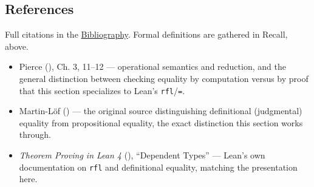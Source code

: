 \subsection{References}\label{sec:05-rigor-check:04-defeq-vs-propeq:8}

Full citations in the \hyperref[sec:root:bibliography:1]{Bibliography}. Formal definitions are gathered in Recall, above.

\begin{itemize}
\tightlist
\item
  Pierce (\cite{Pierce2002}), Ch. 3, 11--12 --- operational semantics and reduction, and the general distinction between checking equality by computation versus by proof that this section specializes to Lean's \texttt{rfl}/\texttt{=}.
\item
  Martin-Löf (\cite{MartinLof1984}) --- the original source distinguishing definitional (judgmental) equality from propositional equality, the exact distinction this section works through.
\item
  \emph{Theorem Proving in Lean 4} (\cite{TPIL4}), ``Dependent Types'' --- Lean's own documentation on \texttt{rfl} and definitional equality, matching the presentation here.
\end{itemize}
